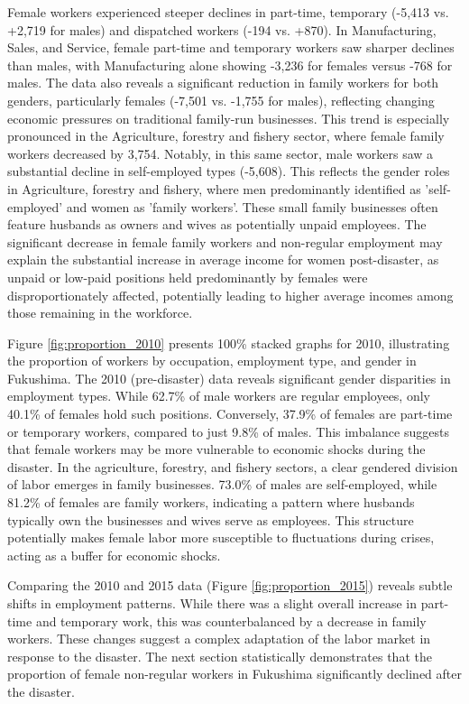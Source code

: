 \documentclass[a4paper,12pt]{article}
\begin{document}
Female workers experienced steeper declines in part-time, temporary (-5,413 vs. +2,719 for males) and dispatched workers (-194 vs. +870). In Manufacturing, Sales, and Service, female part-time and temporary workers saw sharper declines than males, with Manufacturing alone showing -3,236 for females versus -768 for males. The data also reveals a significant reduction in family workers for both genders, particularly females (-7,501 vs. -1,755 for males), reflecting changing economic pressures on traditional family-run businesses. This trend is especially pronounced in the Agriculture, forestry and fishery sector, where female family workers decreased by 3,754. Notably, in this same sector, male workers saw a substantial decline in self-employed types (-5,608). This reflects the gender roles in Agriculture, forestry and fishery, where men predominantly identified as 'self-employed' and women as 'family workers'. These small family businesses often feature husbands as owners and wives as potentially unpaid employees. The significant decrease in female family workers and non-regular employment may explain the substantial increase in average income for women post-disaster, as unpaid or low-paid positions held predominantly by females were disproportionately affected, potentially leading to higher average incomes among those remaining in the workforce.


Figure \ref{fig:proportion_2010} presents 100\% stacked graphs for 2010, illustrating the proportion of workers by occupation, employment type, and gender in Fukushima. The 2010 (pre-disaster) data reveals significant gender disparities in employment types. While 62.7\% of male workers are regular employees, only 40.1\% of females hold such positions. Conversely, 37.9\% of females are part-time or temporary workers, compared to just 9.8\% of males. This imbalance suggests that female workers may be more vulnerable to economic shocks during the disaster. In the agriculture, forestry, and fishery sectors, a clear gendered division of labor emerges in family businesses. 73.0\% of males are self-employed, while 81.2\% of females are family workers, indicating a pattern where husbands typically own the businesses and wives serve as employees. This structure potentially makes female labor more susceptible to fluctuations during crises, acting as a buffer for economic shocks.

Comparing the 2010 and 2015 data (Figure \ref{fig:proportion_2015}) reveals subtle shifts in employment patterns. While there was a slight overall increase in part-time and temporary work, this was counterbalanced by a decrease in family workers. These changes suggest a complex adaptation of the labor market in response to the disaster. The next section statistically demonstrates that the proportion of female non-regular workers in Fukushima significantly declined after the disaster.
\end{document}
